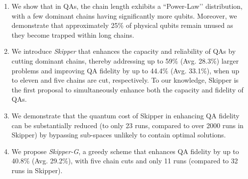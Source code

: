 \begin{enumerate}[ leftmargin=0.5cm,itemindent=0.cm,labelwidth=.5cm,labelsep=0cm,align=left, itemsep=0.2 cm, listparindent=0.5cm]

\item 
We show that in QAs, the chain length exhibits a ``Power-Law’’ distribution, with a few dominant chains having significantly more qubits. 
Moreover, we demonstrate that approximately 25\% of physical qubits remain unused as they become trapped within long chains.

\item 
We introduce \emph{Skipper} that enhances the capacity and reliability of QAs by cutting dominant chains, 
thereby addressing up to 59\% (Avg. 28.3\%) larger problems and improving QA fidelity by up to 44.4\% (Avg. 33.1\%), when up to eleven and five chains are cut, respectively.
To our knowledge, Skipper is the first proposal to simultaneously enhance both the capacity and fidelity of QAs.
 
\item 
We demonstrate that the quantum cost of Skipper in enhancing QA fidelity can be substantially reduced (to only 23 runs, compared to over 2000 runs in Skipper) by bypassing sub-spaces unlikely to contain optimal solutions.

\item 
We propose \emph{Skipper-G}, a greedy scheme that enhances QA fidelity by up to 40.8\% (Avg. 29.2\%), with five chain cuts and only 11 runs (compared to 32 runs in Skipper). 

\end{enumerate}
     


